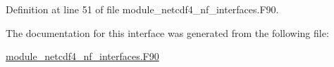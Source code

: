 Definition at line 51 of file module\+\_\+netcdf4\+\_\+nf\+\_\+interfaces.\+F90.



The documentation for this interface was generated from the following file\+:\begin{DoxyCompactItemize}
\item 
\hyperlink{module__netcdf4__nf__interfaces_8F90}{module\+\_\+netcdf4\+\_\+nf\+\_\+interfaces.\+F90}\end{DoxyCompactItemize}

